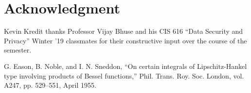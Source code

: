 \documentclass[journal]{IEEEtran}
\begin{document}


\section*{Acknowledgment}
Kevin Kredit thanks Professor Vijay Bhuse and his CIS 616 ``Data Security and Privacy'' Winter '19
classmates for their constructive input over the course of the semester.


\begin{thebibliography}{00}
 G. Eason, B. Noble, and I. N. Sneddon, ``On certain integrals of Lipschitz-Hankel type
involving products of Bessel functions,'' Phil. Trans. Roy. Soc. London, vol. A247, pp. 529--551,
April 1955.
\end{thebibliography}
\end{document}
